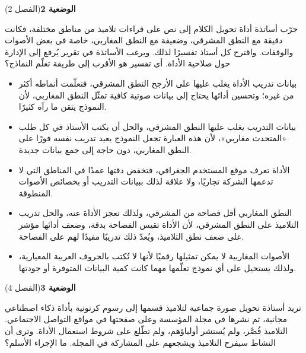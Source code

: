 \documentclass[11pt,a4paper]{article}
\begin{document}
\par\vspace{6pt}
\noindent
{\large\khatt\textbf{الوضعية 2}}\hfill{\small(الفصل 2)}\par\nopagebreak\vspace{3pt}
\setlength{\fboxsep}{7pt}\colorbox{gray!10}{\parbox{\dimexpr\linewidth-14pt}{جرّب أساتذة أداة تحويل الكلام إلى نص على قراءات تلاميذ من مناطق مختلفة، فكانت دقيقة مع النطق المشرقي، وضعيفة مع النطق المغاربي، خاصة في بعض الأصوات والوقفات. واقترح كل أستاذ تفسيرًا لذلك. ويرغب الأساتذة في تقرير يُرفع إلى الإدارة حول صلاحية الأداة. أي تفسير هو الأقرب إلى طريقة تعلّم النماذج؟}}\par\nopagebreak
\begin{itemize}[leftmargin=1.0cm, labelsep=6pt, itemsep=3pt, topsep=4pt, parsep=0pt]
  \item[\textbf{أ)}] بيانات تدريب الأداة يغلب عليها على الأرجح النطق المشرقي، فتعلّمت أنماطه أكثر من غيره؛ وتحسين أدائها يحتاج إلى بيانات صوتية كافية تمثّل النطق المغاربي، لأن النموذج يتقن ما رآه كثيرًا.
  \item[\textbf{ب)}] بيانات التدريب يغلب عليها النطق المشرقي، والحل أن يكتب الأستاذ في كل طلب «المتحدث مغاربي»، لأن هذه العبارة تجعل النموذج يعيد تدريب نفسه فورًا على النطق المغاربي، دون حاجة إلى جمع بيانات جديدة.
  \item[\textbf{ج)}] الأداة تعرف موقع المستخدم الجغرافي، فتخفض دقتها عمدًا في المناطق التي لا تدعمها الشركة تجاريًا، ولا علاقة لذلك ببيانات التدريب أو بخصائص الأصوات المنطوقة.
  \item[\textbf{د)}] النطق المغاربي أقل فصاحة من المشرقي، ولذلك تعجز الأداة عنه، والحل تدريب التلاميذ على النطق المشرقي، لأن الأداة تقيس الفصاحة بدقة، وضعف أدائها مؤشر على ضعف نطق التلاميذ، ويُعدّ ذلك تدريبًا مفيدًا لهم على الفصاحة.
  \item[\textbf{هـ)}] الأصوات المغاربية لا يمكن تمثيلها رقميًا لأنها لا تُكتب بالحروف العربية المعيارية، ولذلك يستحيل على أي نموذج تعلّمها مهما كانت كمية البيانات المتوفرة أو جودتها.
\end{itemize}
\par\vspace{6pt}
\noindent
{\large\khatt\textbf{الوضعية 3}}\hfill{\small(الفصل 4)}\par\nopagebreak\vspace{3pt}
\setlength{\fboxsep}{7pt}\colorbox{gray!10}{\parbox{\dimexpr\linewidth-14pt}{تريد أستاذة تحويل صورة جماعية لتلاميذ قسمها إلى رسوم كرتونية بأداة ذكاء اصطناعي مجانية، ثم نشرها في مجلة المؤسسة وعلى صفحتها في مواقع التواصل الاجتماعي. التلاميذ قُصَّر، ولم يُستشر أولياؤهم، ولم تطّلع على شروط استعمال الأداة. وترى أن النشاط سيفرح التلاميذ ويشجعهم على المشاركة في المجلة. ما الإجراء الأسلم؟}}\par\nopagebreak
\end{document}
